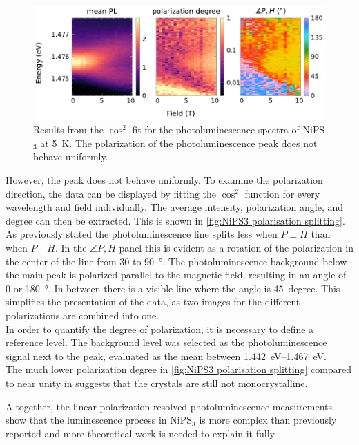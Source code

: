\documentclass[
	twoside,
	parskip=half,
	a4paper,
]{scrbook}
\begin{document}
\clearpage
\begin{figure}
	\centering
	\includegraphics{../figures/2024-04-09 NiPS3 polarisation Splitting.pdf}
	\caption{Results from the $\cos^2$ fit for the photoluminescence spectra of NiPS$_3$ at \SI{5}{K}. The polarization of the photoluminescence peak does not behave uniformly.}
	\label{fig:NiPS3 polarisation splitting}
\end{figure}
However, the peak does not behave uniformly.
To examine the polarization direction, the data can be displayed by fitting the $\cos^2$ function for every wavelength and field individually.
The average intensity, polarization angle, and degree can then be extracted.
This is shown in \autoref{fig:NiPS3 polarisation splitting}.\\
As previously stated the photoluminescence line splits less when $P\perp H$ than when $P\parallel H$.
In the $\measuredangle P, H$-panel this is evident as a rotation of the polarization in the center of the line from $30$ to \SI{90}{\degree}.
The photoluminescence background below the main peak is polarized parallel to the magnetic field, resulting in an angle of $0$ or \SI{180}{\degree}.
In between there is a visible line where the angle is \SI{45}{degree}.
This simplifies the presentation of the data, as two images for the different polarizations are combined into one.\\
In order to quantify the degree of polarization, it is necessary to define a reference level.
The background level was selected as the photoluminescence signal next to the peak, evaluated as the mean between \SIrange{1.442}{1.467}{eV}.\\
The much lower polarization degree in \autoref{fig:NiPS3 polarisation splitting} compared to near unity in \cite{NiPS3_anisotropic} suggests that the crystals are still not monocrystalline.

Altogether, the linear polarization-resolved photoluminescence measurements show that the luminescence process in NiPS$_3$ is more complex than previously reported \cite{NiPS3_linear,NiPS3_magnon_gap} and more theoretical work is needed to explain it fully.
\end{document}
